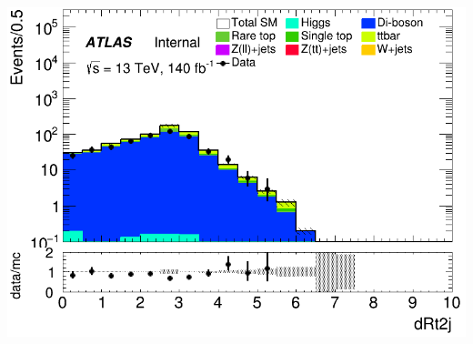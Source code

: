 \documentclass[usenames,dvipsnames]{beamer}
\begin{document}
\begin{frame}
\begin{minipage}{0.32\textwidth}
        \includegraphics[width=\textwidth]{graphics/LLL_met/LLL_met_dRt2j.png}
    \end{minipage}
    
    \vspace{0.5cm} %


\end{frame}
\end{document}
